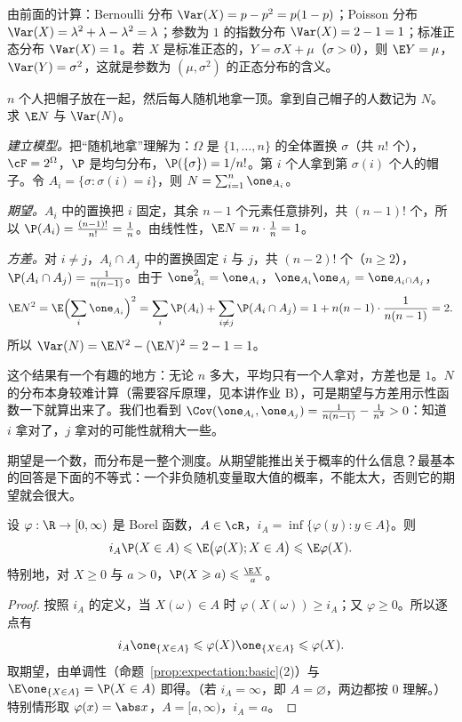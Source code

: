 \begin{example}[常见分布的方差]
由前面的计算：Bernoulli 分布 $\Var(X)=p-p^2=p(1-p)$；Poisson 分布 $\Var(X)=\lambda^2+\lambda-\lambda^2=\lambda$；参数为 $1$ 的指数分布 $\Var(X)=2-1=1$；标准正态分布 $\Var(X)=1$。若 $X$ 是标准正态的，$Y=\sigma X+\mu$（$\sigma>0$），则 $\E Y=\mu$，$\Var(Y)=\sigma^2$，这就是参数为 $(\mu,\sigma^2)$ 的正态分布的含义。
\end{example}

\begin{workedexample}[配对问题]\label{we:expectation:matching}
$n$ 个人把帽子放在一起，然后每人随机地拿一顶。拿到自己帽子的人数记为 $N$。求 $\E N$ 与 $\Var(N)$。
\end{workedexample}
\begin{solution}
\emph{建立模型。}把“随机地拿”理解为：$\Omega$ 是 $\{1,\dots,n\}$ 的全体置换 $\sigma$（共 $n!$ 个），$\cF=2^\Omega$，$\P$ 是均匀分布，$\P(\{\sigma\})=1/n!$。第 $i$ 个人拿到第 $\sigma(i)$ 个人的帽子。令 $A_i=\{\sigma:\sigma(i)=i\}$，则 $N=\sum_{i=1}^n\one_{A_i}$。

\emph{期望。}$A_i$ 中的置换把 $i$ 固定，其余 $n-1$ 个元素任意排列，共 $(n-1)!$ 个，所以 $\P(A_i)=\frac{(n-1)!}{n!}=\frac1n$。由线性性，$\E N=n\cdot\frac1n=1$。

\emph{方差。}对 $i\neq j$，$A_i\cap A_j$ 中的置换固定 $i$ 与 $j$，共 $(n-2)!$ 个（$n\geqslant2$），$\P(A_i\cap A_j)=\frac1{n(n-1)}$。由于 $\one_{A_i}^2=\one_{A_i}$，$\one_{A_i}\one_{A_j}=\one_{A_i\cap A_j}$，
\[
\E N^2=\E\Bigl(\sum_i\one_{A_i}\Bigr)^2=\sum_i\P(A_i)+\sum_{i\neq j}\P(A_i\cap A_j)=1+n(n-1)\cdot\frac1{n(n-1)}=2 .
\]
所以 $\Var(N)=\E N^2-(\E N)^2=2-1=1$。

这个结果有一个有趣的地方：无论 $n$ 多大，平均只有一个人拿对，方差也是 $1$。$N$ 的分布本身较难计算（需要容斥原理，见本讲作业 B），可是期望与方差用示性函数一下就算出来了。我们也看到 $\Cov(\one_{A_i},\one_{A_j})=\frac1{n(n-1)}-\frac1{n^2}>0$：知道 $i$ 拿对了，$j$ 拿对的可能性就稍大一些。
\end{solution}


期望是一个数，而分布是一整个测度。从期望能推出关于概率的什么信息？最基本的回答是下面的不等式：一个非负随机变量取大值的概率，不能太大，否则它的期望就会很大。

\begin{theorem}\label{thm:expectation:markov}
设 $\varphi:\R\to[0,\infty)$ 是 Borel 函数，$A\in\cR$，$i_A=\inf\{\varphi(y):y\in A\}$。则
\[
i_A\P(X\in A)\leqslant \E\bigl(\varphi(X);X\in A\bigr)\leqslant \E\varphi(X).
\]
特别地，对 $X\geqslant0$ 与 $a>0$，$\P(X\geqslant a)\leqslant\frac{\E X}a$。
\end{theorem}
\begin{proof}
按照 $i_A$ 的定义，当 $X(\omega)\in A$ 时 $\varphi(X(\omega))\geqslant i_A$；又 $\varphi\geqslant0$。所以逐点有
\[
i_A\one_{\{X\in A\}}\leqslant\varphi(X)\one_{\{X\in A\}}\leqslant\varphi(X).
\]
取期望，由单调性（命题~\ref{prop:expectation:basic}(2)）与 $\E\one_{\{X\in A\}}=\P(X\in A)$ 即得。（若 $i_A=\infty$，即 $A=\varnothing$，两边都按 $0$ 理解。）特别情形取 $\varphi(x)=\abs x$，$A=[a,\infty)$，$i_A=a$。
\end{proof}

